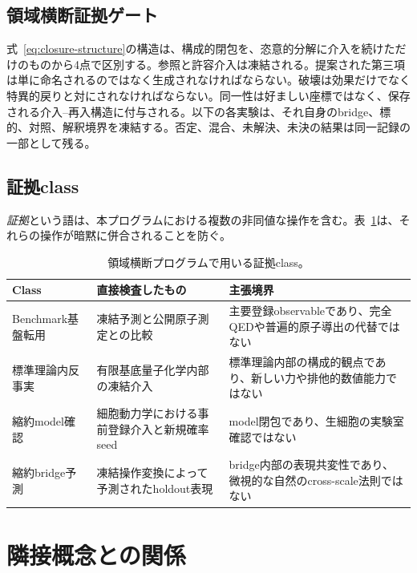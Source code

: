 \documentclass[11pt,a4paper]{article}
\begin{document}
\subsection{領域横断証拠ゲート}

式~\eqref{eq:closure-structure}の構造は、構成的閉包を、恣意的分解に介入を続けただけのものから4点で区別する。参照と許容介入は凍結される。提案された第三項は単に命名されるのではなく生成されなければならない。破壊は効果だけでなく特異的戻りと対にされなければならない。同一性は好ましい座標ではなく、保存される介入--再入構造に付与される。以下の各実験は、それ自身のbridge、標的、対照、解釈境界を凍結する。否定、混合、未解決、未決の結果は同一記録の一部として残る。

\subsection{証拠class}

\emph{証拠}という語は、本プログラムにおける複数の非同値な操作を含む。表~\ref{tab:evidence-classes}は、それらの操作が暗黙に併合されることを防ぐ。

\begin{table}[H]
\centering
\footnotesize
\caption{領域横断プログラムで用いる証拠class。}
\label{tab:evidence-classes}
\begin{tabularx}{\textwidth}{@{}>{\raggedright\arraybackslash}p{2.8cm}>{\raggedright\arraybackslash}X>{\raggedright\arraybackslash}p{4.1cm}@{}}
\toprule
Class & 直接検査したもの & 主張境界 \\
\midrule
Benchmark基盤転用 & 凍結予測と公開原子測定との比較 & 主要登録observableであり、完全QEDや普遍的原子導出の代替ではない \\
標準理論内反事実 & 有限基底量子化学内部の凍結介入 & 標準理論内部の構成的観点であり、新しい力や排他的数値能力ではない \\
縮約model確認 & 細胞動力学における事前登録介入と新規確率seed & model閉包であり、生細胞の実験室確認ではない \\
縮約bridge予測 & 凍結操作変換によって予測されたholdout表現 & bridge内部の表現共変性であり、微視的な自然のcross-scale法則ではない \\
\bottomrule
\end{tabularx}
\end{table}

\section{隣接概念との関係}
\end{document}
